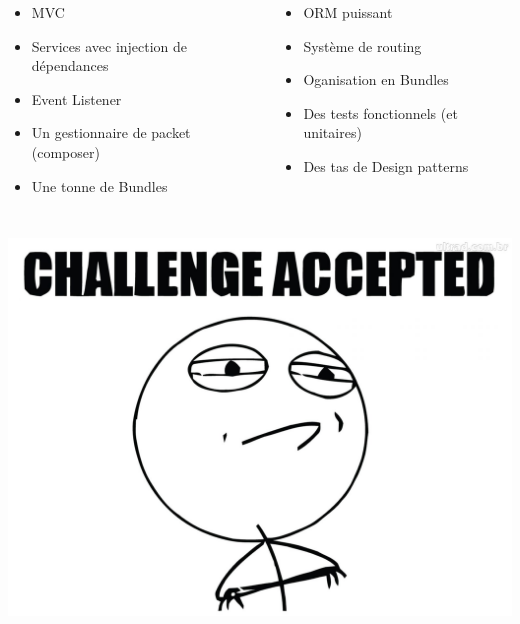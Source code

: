 \documentclass[12pt, francais]{beamer}
\begin{document}
\begin{frame}
	\pause
	\begin{block}{}
		\begin{columns}
				\begin{itemize}
					\item MVC  \\
					\item Services avec injection de d\'ependances  \\
					\item Event Listener  \\
					\item Un gestionnaire de packet (composer)  \\
					\item Une tonne de Bundles  \\
				\end{itemize}
				\begin{itemize}
					\item ORM puissant \\
					\item Syst\`eme de routing \\
					\item Oganisation en Bundles \\
					\item Des tests fonctionnels (et unitaires) \\
					\item Des tas de Design patterns  \\
				\end{itemize}
		\end{columns}
	\end{block}
\end{frame}

\begin{frame}
	\begin{center}
		\includegraphics[width=.5\linewidth]{Pictures/challenge.jpeg}
	\end{center}

\end{frame}
\end{document}
